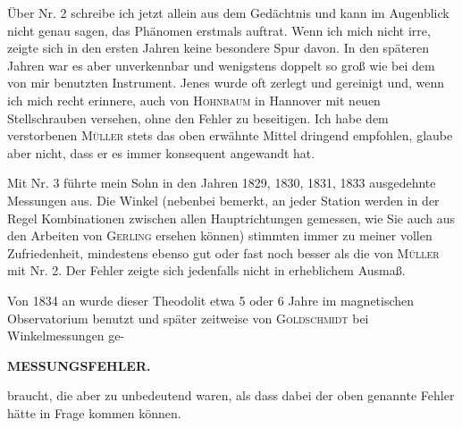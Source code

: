 \par\noindent\hspace*{\parindent}Über Nr. 2 schreibe ich jetzt allein aus dem Gedächtnis und kann im Augenblick nicht genau sagen,  das Phänomen erstmals auftrat. Wenn ich mich nicht irre, zeigte sich in den ersten Jahren keine besondere Spur davon. In den späteren Jahren war es aber unverkennbar und wenigstens doppelt so groß wie bei dem von mir benutzten Instrument. Jenes wurde oft zerlegt und gereinigt und, wenn ich mich recht erinnere, auch von \textsc{Hohnbaum} in Hannover mit neuen Stellschrauben versehen, ohne den Fehler zu beseitigen. Ich habe dem verstorbenen \textsc{Müller} stets das oben erwähnte Mittel dringend empfohlen, glaube aber nicht, dass er es immer konsequent angewandt hat.

\par\noindent\hspace*{\parindent}Mit Nr. 3 führte mein Sohn in den Jahren 1829, 1830, 1831, 1833  ausgedehnte Messungen aus. Die Winkel (nebenbei bemerkt, an jeder Station werden in der Regel  Kombinationen zwischen allen Hauptrichtungen gemessen, wie Sie auch aus den Arbeiten von \textsc{Gerling} ersehen können) stimmten immer zu meiner vollen Zufriedenheit, mindestens ebenso gut oder fast noch besser als die von \textsc{Müller} mit Nr. 2. Der Fehler zeigte sich jedenfalls nicht in erheblichem Ausmaß.

\par\noindent\hspace*{\parindent}Von 1834 an wurde dieser Theodolit etwa 5 oder 6 Jahre im magnetischen Observatorium benutzt und später zeitweise von \textsc{Goldschmidt} bei Winkelmessungen ge-

\par\clearpage
\noindent\null\hfill{\small\textbf{MESSUNGSFEHLER.}}\hfill{}\par\medskip
\noindent braucht, die aber zu unbedeutend waren, als dass dabei der oben genannte Fehler hätte in Frage kommen können.

